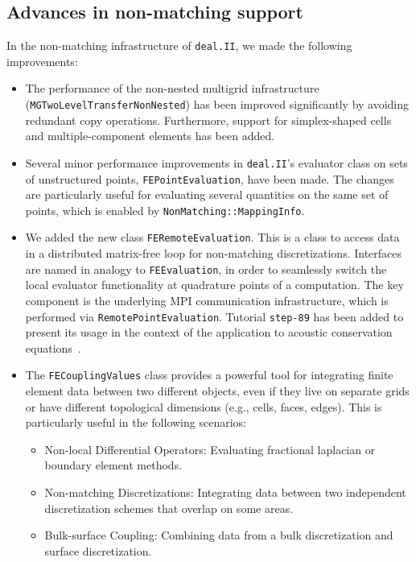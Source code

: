 \documentclass{ansarticle-preprint}
\newcommand{\specialword}[1]{\texttt{#1}}
\newcommand{\dealii}{{\specialword{deal.II}}\xspace}
\newcommand{\step}[1]{{\specialword{step-#1}}\xspace}
\begin{document}
\subsection{Advances in non-matching support}\label{sec:nonmatching}


In the non-matching infrastructure of \dealii, we made the following improvements:

\begin{itemize}
\item The performance of the non-nested multigrid infrastructure
(\texttt{MGTwoLevelTransferNon\-Nested}) has been improved significantly by avoiding
redundant copy operations. Furthermore, support for simplex-shaped cells and
multiple-component elements has been added.
\item Several minor performance improvements in \dealii's evaluator class on
  sets of unstructured points, \texttt{FEPointEvaluation}, have been
  made. The changes are particularly useful for evaluating several quantities on the
  same set of points, which is enabled by \texttt{NonMatching::MappingInfo}.
\item We added the new class \texttt{FERemoteEvaluation}.
This is a class to access data
in a distributed matrix-free loop for non-matching discretizations.
Interfaces are named in analogy to \texttt{FEEvaluation}, in order to seamlessly switch the
local evaluator functionality at quadrature points of a computation. The key component is the
underlying MPI communication infrastructure, which is performed via \texttt{RemotePointEvaluation}.
Tutorial \step{89} has been added to present its usage
in the context of the application to acoustic conservation equations~\cite{heinz2023high}.

\item The \texttt{FECouplingValues} class provides a powerful tool for
 integrating finite element data between two different objects, even if they
 live on separate grids or have different topological dimensions (e.g., cells,
 faces, edges). This is particularly useful in the following scenarios: 
 \begin{itemize}
  \item Non-local Differential Operators: Evaluating fractional laplacian or
  boundary element methods.  
  \item Non-matching Discretizations: Integrating data between two independent
  discretization schemes that overlap on some areas. 
  \item Bulk-surface Coupling: Combining data from a bulk discretization and
  surface discretization.
 \end{itemize}


\end{itemize}
\end{document}
